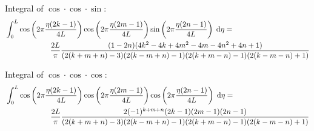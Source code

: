 Integral of $\cos \cdot \cos \cdot \sin$:
~
\begin{equation*}
\begin{split}
    & \int^L_0 \cos\left( 2 \pi \frac{\eta (2 k - 1)}{4 L} \right)
    \cos\left( 2 \pi \frac{\eta (2 m - 1)}{4 L} \right)
    \sin\left( 2 \pi \frac{\eta (2 n - 1)}{4 L} \right) \;\mathrm{d}\eta =
    \\ & \qquad \qquad \qquad
    \frac{2 L}{\pi} \frac{
    (1 - 2n)(4k^2 - 4k + 4m^2 - 4m - 4n^2 + 4n + 1)
    }{
    (2(k+m+n)-3)(2(k-m+n)-1)(2(k+m-n)-1)(2(k-m-n)+1)
    }
\end{split}
\end{equation*}

Integral of $\cos \cdot \cos \cdot \cos$:
~
\begin{equation*}
\begin{split}
    & \int^L_0 \cos\left( 2 \pi \frac{\eta (2 k - 1)}{4 L} \right)
    \cos\left( 2 \pi \frac{\eta (2 m - 1)}{4 L} \right)
    \cos\left( 2 \pi \frac{\eta (2 n - 1)}{4 L} \right) \;\mathrm{d}\eta =
    \\ & \qquad \qquad \qquad
    \frac{2 L}{\pi} \frac{
    2(-1)^{k+m+n}(2k - 1)(2m - 1)(2n - 1)
    }{
    (2(k+m+n)-3)(2(k-m+n)-1)(2(k+m-n)-1)(2(k-m-n)+1)
    }
\end{split}
\end{equation*}